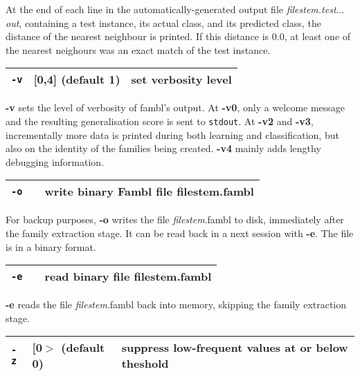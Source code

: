 \documentclass[11pt]{article}
\begin{document}
At the end of each line in the automatically-generated output file
{\sl filestem.test$\ldots$out}, containing a test instance, its actual
class, and its predicted class, the distance of the nearest neighbour
is printed. If this distance is $0.0$, at least one of the nearest
neighours was an exact match of the test instance.
\ \\

\begin{tabular}{|p{}|p{}|p{}|}
\hline
{\tt -v} & [0,4] (default 1) & set verbosity level \\
\hline
\end{tabular}

{\bf -v} sets the level of verbosity of {\sc fambl}'s output. At {\bf
-v0}, only a welcome message and the resulting generalisation score is
sent to {\tt stdout}. At {\bf -v2} and {\bf -v3}, incrementally more
data is printed during both learning and classification, but also on
the identity of the families being created. {\bf -v4} mainly adds
lengthy debugging information.  
\ \\

\begin{tabular}{|p{}|p{}|p{}|}
\hline
{\tt -o} & & write binary Fambl file filestem.fambl \\
\hline
\end{tabular}

For backup purposes, {\bf -o} writes the file {\sl filestem}.fambl to
disk, immediately after the family extraction stage. It can be read
back in a next session with {\bf -e}. The file is in a binary format.
\ \\

\begin{tabular}{|p{}|p{}|p{}|}
\hline
{\tt -e} & & read binary file filestem.fambl \\
\hline
\end{tabular}

{\bf -e} reads the file {\sl filestem}.fambl back into memory,
skipping the family extraction stage.
\ \\

\begin{tabular}{|p{}|p{}|p{}|}
\hline {\tt -z} & [0$>$ (default 0) & suppress low-frequent values at
or below theshold \\ \hline
\end{tabular}
\end{document}
